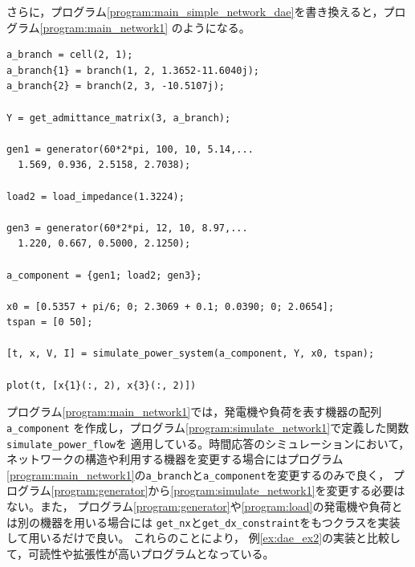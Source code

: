 \documentclass[tombow,dvipdfmx]{corona-a5-1.1}
\begin{document}
\begin{例}[発電機と負荷のモジュール化]
さらに，プログラム\nobreak\ref{program:main_simple_network_dae}を書き換えると，プログラム\nobreak\ref{program:main_network1}
のようになる。
\begin{PROGRAMA}[count,title={main\_simulation\_3bus.m}]\label{program:main_network1}
\begin{verbatim}
a_branch = cell(2, 1);
a_branch{1} = branch(1, 2, 1.3652-11.6040j);
a_branch{2} = branch(2, 3, -10.5107j);

Y = get_admittance_matrix(3, a_branch);

gen1 = generator(60*2*pi, 100, 10, 5.14,...
  1.569, 0.936, 2.5158, 2.7038);

load2 = load_impedance(1.3224);

gen3 = generator(60*2*pi, 12, 10, 8.97,...
  1.220, 0.667, 0.5000, 2.1250);

a_component = {gen1; load2; gen3};

x0 = [0.5357 + pi/6; 0; 2.3069 + 0.1; 0.0390; 0; 2.0654];
tspan = [0 50];

[t, x, V, I] = simulate_power_system(a_component, Y, x0, tspan);

plot(t, [x{1}(:, 2), x{3}(:, 2)])
\end{verbatim}
\end{PROGRAMA}

プログラム\nobreak\ref{program:main_network1}では，発電機や負荷を表す機器の配列\verb|a_component|
を作成し，プログラム\nobreak\ref{program:simulate_network1}で定義した関数\verb|simulate_power_flow|を
適用している。時間応答のシミュレーションにおいて，ネットワークの構造や利用する機器を変更する場合にはプログラム
\ref{program:main_network1}の\verb|a_branch|と\verb|a_component|を変更するのみで良く，
プログラム\nobreak\ref{program:generator}から\ref{program:simulate_network1}を変更する必要はない。また，
プログラム\nobreak\ref{program:generator}や\ref{program:load}の発電機や負荷とは別の機器を用いる場合には
\verb|get_nx|と\verb|get_dx_constraint|をもつクラスを実装して用いるだけで良い。
これらのことにより，
例\ref{ex:dae_ex2}の実装と比較して，可読性や拡張性が高いプログラムとなっている。
\end{例}
\end{document}
